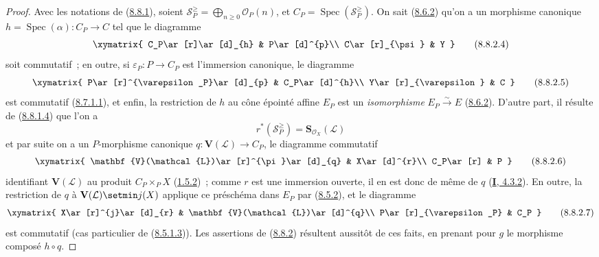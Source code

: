 \begin{proof}
Avec les notations de (\hyperref[II.8.8.1-fr]{8.8.1}), soient
$\mathcal{S}_P^{\geqslant}=\bigoplus_{n\geqslant 0}\mathcal{O}_P(n)$, et
$C_P=\operatorname{Spec}(\mathcal{S}_P^{\geqslant})$. On sait
(\hyperref[II.8.6.2-fr]{8.6.2}) qu'on a un morphisme canonique
$h=\operatorname{Spec}(\alpha):C_P\to C$ tel que le diagramme
\begin{equation}
\label{II.8.8.2.4-fr}
  \xymatrix{
    C_P\ar[r]\ar[d]_{h} & P\ar[d]^{p}\\
    C\ar[r]_{\psi} & Y
  }
\tag{8.8.2.4}
\end{equation}
soit commutatif~; en outre, si $\varepsilon_P:P\to C_P$ est l'immersion
canonique, le diagramme
\begin{equation}
\label{II.8.8.2.5-fr}
  \xymatrix{
    P\ar[r]^{\varepsilon_P}\ar[d]_{p} & C_P\ar[d]^{h}\\
    Y\ar[r]_{\varepsilon} & C
  }
\tag{8.8.2.5}
\end{equation}
est commutatif (\hyperref[II.8.7.1.1-fr]{8.7.1.1}), et enfin, la restriction
de $h$ au cône épointé affine $E_P$ est un \emph{isomorphisme}
$E_P\xrightarrow{\sim}E$ (\hyperref[II.8.6.2-fr]{8.6.2}). D'autre part, il
résulte de (\hyperref[II.8.8.1.4-fr]{8.8.1.4}) que l'on a
\[
  r^*(\mathcal{S}_P^{\geqslant})=
  \mathbf{S}_{\mathcal{O}_X}(\mathcal{L})
\]
et par suite on a un $P$-morphisme canonique
$q:\mathbf{V}(\mathcal{L})\to C_P$, le diagramme commutatif
\begin{equation}
\label{II.8.8.2.6-fr}
  \xymatrix{
    \mathbf{V}(\mathcal{L})\ar[r]^{\pi}\ar[d]_{q} & X\ar[d]^{r}\\
    C_P\ar[r] & P
  }
\tag{8.8.2.6}
\end{equation}
identifiant $\mathbf{V}(\mathcal{L})$ au produit $C_P\times_P X$
(\hyperref[II.1.5.2-fr]{1.5.2})~; comme $r$ est une immersion ouverte, il en
est donc de même de $q$ (\hyperref[I.4.3.2-fr]{\textbf{I}, 4.3.2}). En outre, la
restriction de $q$ à $\mathbf{V}(\mathcal{L})\setmin j(X)$ applique ce préschéma dans
$E_P$ par (\hyperref[II.8.5.2-fr]{8.5.2}), et le diagramme
\begin{equation}
\label{II.8.8.2.7-fr}
  \xymatrix{
    X\ar[r]^{j}\ar[d]_{r} & \mathbf{V}(\mathcal{L})\ar[d]^{q}\\
    P\ar[r]_{\varepsilon_P} & C_P
  }
\tag{8.8.2.7}
\end{equation}
est commutatif (cas particulier de
(\hyperref[II.8.5.1.3-fr]{8.5.1.3})). Les assertions de
(\hyperref[II.8.8.2-fr]{8.8.2}) résultent aussitôt de ces faits, en prenant
pour $g$ le morphisme composé $h\circ q$.
\end{proof}

